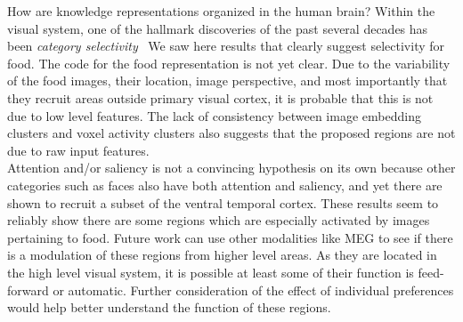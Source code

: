 \documentclass[../thesis.tex]{subfiles}
\begin{document}
How are knowledge representations organized in the human brain? Within the visual system, one of the hallmark discoveries of the past several decades has been \textit{category selectivity}~\cite{Sergent1992,Kanwisher1997,Epstein1998,Downing2001} We saw here results that clearly suggest selectivity for food. The code for the food representation is not yet clear. Due to the variability of the food images, their location, image perspective, and most importantly that they recruit areas outside primary visual cortex, it is probable that this is not due to low level features. The lack of consistency between image embedding clusters and voxel activity clusters also suggests that the proposed regions are not due to raw input features. \\

Attention and/or saliency is not a convincing hypothesis on its own because other categories such as faces also have both attention and saliency, and yet there are shown to recruit a subset of the ventral temporal cortex. These results seem to reliably show there are some regions which are especially activated by images pertaining to food. Future work can use other modalities like MEG to see if there is a modulation of these regions from higher level areas. As they are located in the high level visual system, it is possible at least some of their function is feed-forward or automatic. Further consideration of the effect of individual preferences would help better understand the function of these regions.
\end{document}

